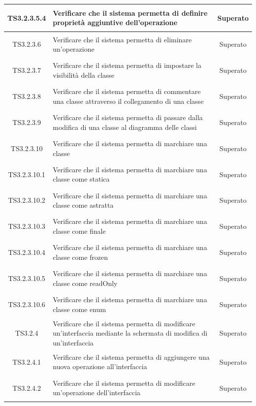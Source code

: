 \documentclass[../PianoDiQualifica.tex]{subfiles}
\begin{document}
\begin{longtable}{|c|>{\centering}p{10cm}|c|}
	\hline
	\hypertarget{TS3.2.3.5.4}{TS3.2.3.5.4} & Verificare che il sistema permetta di definire proprietà aggiuntive dell'operazione & Superato\\
	\hline
	\hypertarget{TS3.2.3.6}{TS3.2.3.6} & Verificare che il sistema permetta di eliminare un'operazione & Superato \\
	\hline
	\hypertarget{TS3.2.3.7}{TS3.2.3.7} & Verificare che il sistema permetta di impostare la visibilità della classe & Superato \\
	\hline
	\hypertarget{TS3.2.3.8}{TS3.2.3.8} & Verificare che il sistema permetta di commentare una classe attraverso il collegamento di una classe & Superato \\
	\hline
	\hypertarget{TS3.2.3.9}{TS3.2.3.9} & Verificare che il sistema permetta di passare dalla modifica di una classe al diagramma delle classi & Superato \\
	\hline
	\hypertarget{TS3.2.3.10}{TS3.2.3.10} & Verificare che il sistema permetta di marchiare una classe & Superato\\
	\hline
	\hypertarget{TS3.2.3.10.1}{TS3.2.3.10.1} & Verificare che il sistema permetta di marchiare una classe come statica & Superato \\
	\hline
	\hypertarget{TS3.2.3.10.2}{TS3.2.3.10.2} & Verificare che il sistema permetta di marchiare una classe come astratta & Superato\\
	\hline
	\hypertarget{TS3.2.3.10.3}{TS3.2.3.10.3} & Verificare che il sistema permetta di marchiare una classe come finale & Superato\\
	\hline
	\hypertarget{TS3.2.3.10.4}{TS3.2.3.10.4} & Verificare che il sistema permetta di marchiare una classe come frozen & Superato \\
	\hline
	\hypertarget{TS3.2.3.10.5}{TS3.2.3.10.5} & Verificare che il sistema permetta di marchiare una classe come readOnly & Superato \\
	\hline
	\hypertarget{TS3.2.3.10.6}{TS3.2.3.10.6} & Verificare che il sistema permetta di marchiare una classe come enum & Superato \\
	\hline
	\hypertarget{TS3.2.4}{TS3.2.4} & Verificare che il sistema permetta di modificare un'interfaccia mediante la schermata di modifica di un'interfaccia & Superato \\
	\hline
	\hypertarget{TS3.2.4.1}{TS3.2.4.1} & Verificare che il sistema permetta di aggiungere una nuova operazione all'interfaccia & Superato\\
	\hline
	\hypertarget{TS3.2.4.2}{TS3.2.4.2} & Verificare che il sistema permetta di modificare un'operazione dell'interfaccia & Superato\\

\end{longtable}
\end{document}
